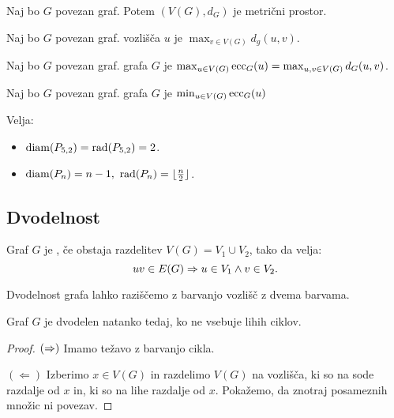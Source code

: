 \begin{trditev}
    Naj bo $G$ povezan graf. Potem $(V(G), d_G)$ je metrični prostor.
\end{trditev}

\begin{definicija}
    Naj bo $G$ povezan graf.  vozlišča $u$ je $\max_{v \in V(G)} d_g(u,v)$.
\end{definicija}

\begin{definicija}
    Naj bo $G$ povezan graf.  grafa $G$ je $\max_{u \in V(G)} \operatorname{ecc}_G(u) = \max_{u,v \in V(G)} d_G(u,v)$.
\end{definicija}

\begin{definicija}
    Naj bo $G$ povezan graf.  grafa $G$ je $\min_{u \in V(G)} \operatorname{ecc}_G(u)$
\end{definicija}

\begin{primer}
    Velja:
    \begin{itemize}
        \item $\operatorname{diam}(P_{5,2}) = \operatorname{rad}(P_{5,2}) = 2$.
        \item $\operatorname{diam}(P_n) = n-1, \ \operatorname{rad}(P_n) = \lfloor \frac{n}{2} \rfloor$.
    \end{itemize} 
\end{primer}

\subsection{Dvodelnost}
\begin{definicija}
    Graf $G$ je , če obstaja razdelitev $V(G) = V_1 \cup V_2$, tako da velja: $$uv \in E(G) \Rightarrow u \in V_1 \land v \in V_2.$$
\end{definicija}

\begin{primer}
    Dvodelnost grafa lahko raziščemo z barvanjo vozlišč z dvema barvama.
\end{primer}

\begin{izrek}
    Graf $G$ je dvodelen natanko tedaj, ko ne vsebuje lihih ciklov.
\end{izrek}

\begin{proof}
    $(\Rightarrow)$ Imamo težavo z barvanjo cikla.
    
    $(\Leftarrow)$ Izberimo $x \in V(G)$ in razdelimo $V(G)$ na vozlišča, ki so na sode razdalje od $x$ in, ki so na lihe razdalje od $x$. Pokažemo, da znotraj posameznih množic ni povezav.
\end{proof}

